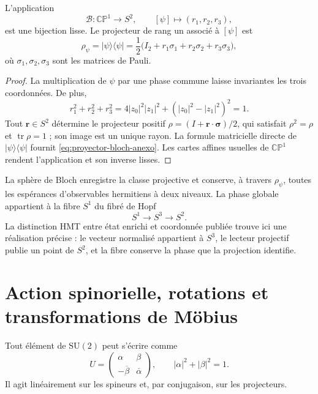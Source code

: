 \begin{theorem}
\label{thm:CP1-esfera-bloch-anexo}
L'application
\begin{equation}
 \mathcal B:\mathbb{CP}^{1}\longrightarrow S^2,
 \qquad [\psi]\longmapsto(r_1,r_2,r_3),
 \label{eq:mapa-bloch-anexo}
\end{equation}
est une bijection lisse. Le projecteur de rang un associé à \([\psi]\) est
\begin{equation}
 \rho_\psi=|\psi\rangle\langle\psi|
 =\frac12\bigl(I_2+r_1\sigma_1+r_2\sigma_2+r_3\sigma_3\bigr),
 \label{eq:proyector-bloch-anexo}
\end{equation}
où \(\sigma_1,\sigma_2,\sigma_3\) sont les matrices de Pauli.
\end{theorem}

\begin{proof}
La multiplication de \(\psi\) par une phase commune laisse invariantes les trois
coordonnées. De plus,
\[
 r_1^2+r_2^2+r_3^2
 =4|z_0|^2|z_1|^2+(|z_0|^2-|z_1|^2)^2=1.
\]
Tout \(\boldsymbol r\in S^2\) détermine le projecteur positif
\(\rho=(I+\boldsymbol r\cdot\boldsymbol\sigma)/2\), qui satisfait
\(\rho^2=\rho\) et \(\operatorname{tr}\rho=1\) ; son image est un unique rayon.
La formule matricielle directe de \(|\psi\rangle\langle\psi|\) fournit
\eqref{eq:proyector-bloch-anexo}. Les cartes affines usuelles de
\(\mathbb{CP}^{1}\) rendent l'application et son inverse lisses.
\end{proof}

La sphère de Bloch enregistre la classe projective et conserve, à travers
\(\rho_\psi\), toutes les espérances d'observables hermitiens à deux niveaux.
La phase globale appartient à la fibre \(S^1\) du fibré de Hopf
\cite{Hopf1931}
\begin{equation}
 S^1\longrightarrow S^3\longrightarrow S^2.
 \label{eq:hopf-bloch-anexo}
\end{equation}
La distinction HMT entre état enrichi et coordonnée publiée trouve
ici une réalisation précise : le vecteur normalisé appartient à \(S^3\), le
lecteur projectif publie un point de \(S^2\), et la fibre conserve la phase que
la projection identifie.

\section{Action spinorielle, rotations et transformations de Möbius}

Tout élément de \(\mathrm{SU}(2)\) peut s'écrire comme
\begin{equation}
 U=
 \begin{pmatrix}
 \alpha&\beta\\
 -\overline\beta&\overline\alpha
 \end{pmatrix},
 \qquad |\alpha|^2+|\beta|^2=1.
 \label{eq:SU2-parametrizacion-anexo}
\end{equation}
Il agit linéairement sur les spineurs et, par conjugaison, sur les projecteurs.


